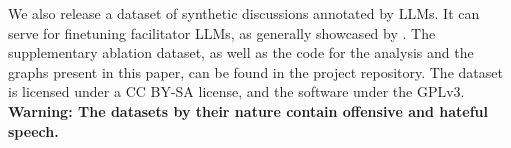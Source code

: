 %

We also release \vmd\datasetlink a dataset of synthetic discussions annotated by \acp{LLM}. It can serve for finetuning facilitator \acp{LLM}, as generally showcased by \citet{ulmer2024}. The supplementary ablation dataset, as well as the code for the analysis and the graphs present in this paper, can be found in the project repository\analysislink. The dataset is licensed under a CC BY-SA license, and the software under the \ac{GPL}v3. \textbf{Warning: The datasets by their nature contain offensive and hateful speech.}